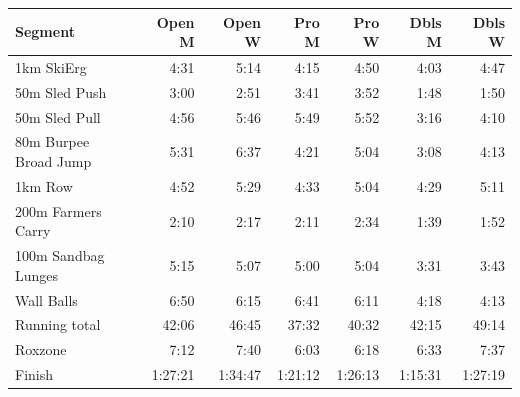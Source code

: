 \begin{tabular}{lrrrrrr}
\toprule
\textbf{Segment} & \multicolumn{1}{r}{\textbf{Open M}} & \multicolumn{1}{r}{\textbf{Open W}} & \multicolumn{1}{r}{\textbf{Pro M}} & \multicolumn{1}{r}{\textbf{Pro W}} & \multicolumn{1}{r}{\textbf{Dbls M}} & \multicolumn{1}{r}{\textbf{Dbls W}} \\
\midrule
1km SkiErg & 4:31 & 5:14 & 4:15 & 4:50 & 4:03 & 4:47 \\
50m Sled Push & 3:00 & 2:51 & 3:41 & 3:52 & 1:48 & 1:50 \\
50m Sled Pull & 4:56 & 5:46 & 5:49 & 5:52 & 3:16 & 4:10 \\
80m Burpee Broad Jump & 5:31 & 6:37 & 4:21 & 5:04 & 3:08 & 4:13 \\
1km Row & 4:52 & 5:29 & 4:33 & 5:04 & 4:29 & 5:11 \\
200m Farmers Carry & 2:10 & 2:17 & 2:11 & 2:34 & 1:39 & 1:52 \\
100m Sandbag Lunges & 5:15 & 5:07 & 5:00 & 5:04 & 3:31 & 3:43 \\
Wall Balls & 6:50 & 6:15 & 6:41 & 6:11 & 4:18 & 4:13 \\
Running total & 42:06 & 46:45 & 37:32 & 40:32 & 42:15 & 49:14 \\
Roxzone & 7:12 & 7:40 & 6:03 & 6:18 & 6:33 & 7:37 \\
Finish & 1:27:21 & 1:34:47 & 1:21:12 & 1:26:13 & 1:15:31 & 1:27:19 \\
\bottomrule
\end{tabular}